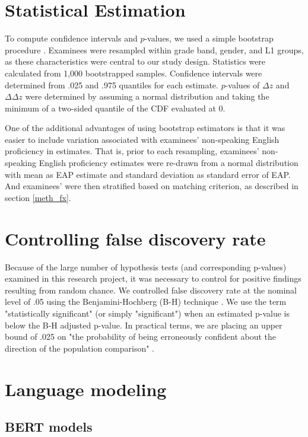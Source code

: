 \documentclass [PhD] {uclathes}
\begin{document}
\section{Statistical Estimation}
\label{meth_boot}

To compute confidence intervals and $p$-values, we used a simple bootstrap procedure \citep{efron1994}. Examinees were resampled within grade band, gender, and L1 groups, as these characteristics were central to our study design. Statistics were calculated from 1,000 bootstrapped samples. Confidence intervals were determined from .025 and .975 quantiles for each estimate. $p$-values of $\Delta z$ and $\Delta \Delta z$ were determined by assuming a normal distribution and taking the minimum of a two-sided quantile of the CDF evaluated at 0. 

One of the additional advantages of using bootstrap estimators is that it was easier to include variation associated with examinees’ non-speaking English proficiency in estimates. That is, prior to each resampling, examinees’ non-speaking English proficiency estimates were re-drawn from a normal distribution with mean as EAP estimate and standard deviation as standard error of EAP. And examinees’ were then stratified based on matching criterion, as described in section \ref{meth_fx}. 

\section{Controlling false discovery rate}
\label{meth_bh}

Because of the large number of hypothesis tests (and corresponding p-values) examined in this research project, it was necessary to control for positive findings resulting from random chance. We controlled false discovery rate at the nominal level of .05 using the Benjamini-Hochberg (B-H) technique \citep{benjamini1995controlling}. We use the term "statistically significant" (or simply "significant") when an estimated p-value is below the B-H adjusted p-value. In practical terms, we are placing an upper bound of .025 on "the probability of being erroneously confident about the direction of the population comparison" \citep[][p. 43]{williams1999controlling}.

\section{Language modeling}
\label{sec:meth_bert}

\subsection{BERT models}
\end{document}
